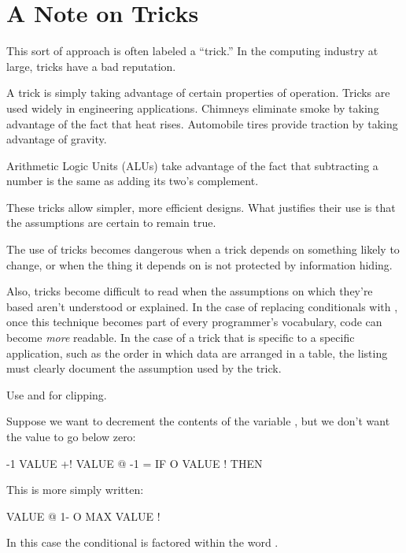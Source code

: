 \section{A Note on Tricks}%
%

This sort of approach is often labeled a ``trick.'' In the computing
industry at large, tricks have a bad reputation.

A trick is simply taking advantage of certain properties of operation.
Tricks are used widely in engineering applications. Chimneys
eliminate smoke by taking advantage of the fact that heat rises.
Automobile tires provide traction by taking advantage of gravity.

Arithmetic Logic Units (ALUs) take advantage of the fact that
subtracting a number is the same as adding its two's complement.

These tricks allow simpler, more efficient designs. What justifies
their use is that the assumptions are certain to remain true.

The use of tricks becomes dangerous when a trick depends on something
likely to change, or when the thing it depends on is not protected by
information hiding.

Also, tricks become difficult to read when the assumptions on which
they're based aren't understood or explained. In the case of replacing
conditionals with , once this technique becomes part of every
programmer's vocabulary, code can become \emph{more} readable. In the case
of a trick that is specific to a specific application, such as the order
in which data are arranged in a table, the listing must clearly document
the assumption used by the trick.%
%
%

\begin{tip}
Use  and  for clipping.
%
%
\end{tip}
Suppose we want to decrement the contents of the variable , but
we don't want the value to go below zero:

\begin{Code}
-1 VALUE +!  VALUE @  -1 = IF  O VALUE !  THEN
\end{Code}
This is more simply written:

\begin{Code}
VALUE @  1-  O MAX  VALUE !
\end{Code}
In this case the conditional is factored within the word .

